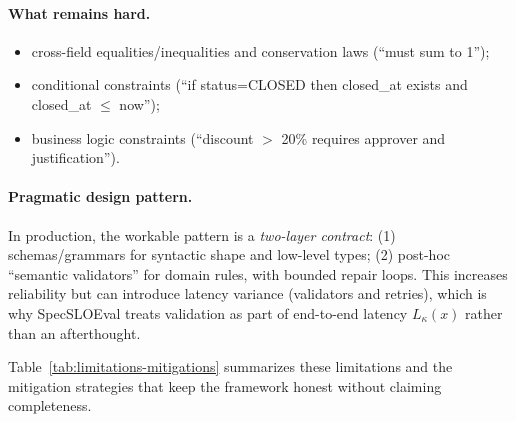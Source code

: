 \documentclass[11pt]{article}
\begin{document}
\paragraph{What remains hard.}
\begin{itemize}[leftmargin=12pt]
    \item cross-field equalities/inequalities and conservation laws (``must sum to 1'');
    \item conditional constraints (``if status=CLOSED then closed\_at exists and closed\_at $\le$ now'');
    \item business logic constraints (``discount $>$ 20\% requires approver and justification'').
\end{itemize}

\paragraph{Pragmatic design pattern.}
In production, the workable pattern is a \emph{two-layer contract}:
(1) schemas/grammars for syntactic shape and low-level types;
(2) post-hoc ``semantic validators'' for domain rules, with bounded repair loops.
This increases reliability but can introduce latency variance (validators and retries), which is why SpecSLOEval treats validation as part of end-to-end latency $L_\kappa(x)$ rather than an afterthought.

Table~\ref{tab:limitations-mitigations} summarizes these limitations and the mitigation strategies that keep the framework honest without claiming completeness.
\end{document}
